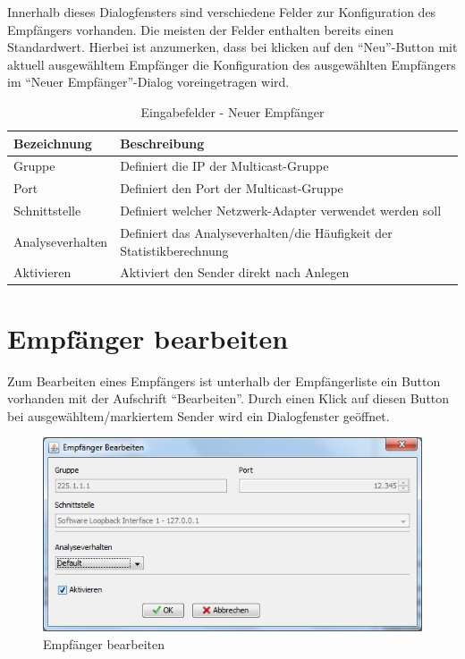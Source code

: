Innerhalb dieses Dialogfensters sind verschiedene Felder zur Konfiguration des
Empfängers vorhanden. Die meisten der Felder enthalten bereits einen
Standardwert. Hierbei ist anzumerken, dass bei klicken auf den ``Neu''-Button mit aktuell
ausgewähltem Empfänger die Konfiguration des ausgewählten
Empfängers im ``Neuer Empfänger''-Dialog voreingetragen wird.

\begin{table}[h]
\caption{Eingabefelder - Neuer Empfänger}
\label{tab:inputNewSender}
\begin{center}
\begin{tabular}{|l|p{10cm}|}
\hline
\textbf{Bezeichnung} & \textbf{Beschreibung}\\
\hline
Gruppe & Definiert die IP der Multicast-Gruppe\\
\hline
Port & Definiert den Port der Multicast-Gruppe\\
\hline
Schnittstelle & Definiert welcher Netzwerk-Adapter verwendet werden soll\\
\hline
Analyseverhalten & Definiert das Analyseverhalten/die Häufigkeit der
Statistikberechnung\\
\hline
 Aktivieren & Aktiviert den Sender direkt nach Anlegen\\
\hline
\end{tabular}
\end{center}
\label{default}
\end{table}

\chapter{Empfänger bearbeiten}
Zum Bearbeiten eines Empfängers ist unterhalb der Empfängerliste
ein Button vorhanden mit der Aufschrift ``Bearbeiten''. Durch einen Klick auf
diesen Button bei ausgewähltem/markiertem Sender wird ein Dialogfenster
geöffnet.

\begin{figure}[htbp]
\begin{center}
\includegraphics[width=14cm]{images/editEmpfaenger.png}
\caption[Empfänger bearbeiten]{Empfänger bearbeiten}
\label{newReceiver}
\end{center}
\end{figure}

